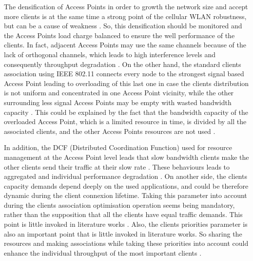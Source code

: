 \documentclass[journal,transmag]{IEEEtran}
\begin{document}
The densification of Access Points in order to growth the network size and accept more clients is at the same time a strong point of the cellular WLAN robustness, but can be a cause of weakness \cite{15Node_throughput_enhencement_wifi}. So, this densification should be monitored and the Access Points load charge balanced to ensure the well performance of the clients. In fact, adjacent Access Points may use the same channels because of the lack of orthogonal channels, which leads to high interference levels and consequently throughput degradation \cite{15Node_throughput_enhencement_wifi,16AP_association_optimisation_fairness}. On the other hand, the standard clients association using IEEE 802.11 connects every node to the strongest signal based Access Point leading to overloading of this last one in case the clients distribution is not uniform and concentrated in one Access Point vicinity, while the other surrounding less signal Access Points may be empty with wasted bandwidth capacity \cite{14optimalAP_INFOCOM,14AP_association_multirate_WLAN,16throughput_optimisation_association_bandwidth}. This could be explained by the fact that the bandwidth capacity of the overloaded Access Point, which is a limited resource in time, is divided by all the associated clients, and the other Access Points resources are not used \cite{04Intelligent_resource_management,16AP_association_optimisation_fairness}. 
 
In addition, the DCF (Distributed Coordination Function) used for resource management at the Access Point level leads that slow bandwidth clients make the other clients send their traffic at their slow rate \cite{15time_fairness_MAC,16AP_association_optimisation_fairness}. These behaviours leads to aggregated and individual performance degradation \cite{15Node_throughput_enhencement_wifi,15OpenSDWN_home_entreprise_WIFI,14online_AP_association_80211n,10Assesment_EDCA_real_time,16Indoor_spatial_reuse_adaptive_antenna}.    
On another side, the clients capacity demands depend deeply on the used applications, and could be therefore dynamic during the client connexion lifetime. Taking this parameter into account during the clients association optimisation operation seems being mandatory, rather than the supposition that all the clients have equal traffic demands. This point is little invoked in literature works \cite{17QOS_AP_selection}. 
Also, the clients priorities parameter is also an important point that is little invoked in literature works. So sharing the resources and making associations while taking these priorities into account could enhance the individual throughput of the most important clients \cite{16VALI_SDN}.
\end{document}
